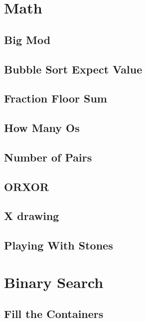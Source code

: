 \section{Math}
        \subsection{Big Mod}
                
        \subsection{Bubble Sort Expect Value}
                
        \subsection{Fraction Floor Sum}
                
        \subsection{How Many Os}
                
        \subsection{Number of Pairs}
                
        \subsection{ORXOR}
                
        \subsection{X drawing}
                
        \subsection{Playing With Stones}
                

\section{Binary Search}
        \subsection{Fill the Containers}
                
